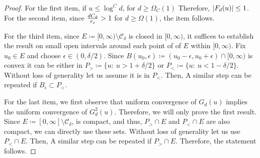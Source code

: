 \begin{proof}
For the first item,  if $u \leq \log^{C} d$, for $d \geq \Omega_{C}(1)$ 
Therefore,  $\lvert F_d(u) \rvert \leq 1$.  For the second item, since  $\tfrac{d C_d }{r_s}  > 1$ for $d   \geq \Omega(1)$,  the item follows.

For the third item,  since  $E \coloneqq [0,\infty)  \setminus  \mathcal{C}_{\delta}$ is closed in $ [0,\infty)$,  it suffices to establish the result on small open intervals around each point of  of $E$ within  $[0,\infty)$.  Fix $u_0 \in E$ and choose $\epsilon \in (0,\delta/2)$.  Since  $B(u_0, \epsilon) \coloneqq (u_0 - \epsilon, u_0 + \epsilon) \cap [0,\infty)$ is convex it can be either in   $P_{>} \coloneqq \{ u : ~ u  > 1 + \delta/2   \}$  or  $P_{<} \coloneqq  \{ u  : ~   u  < 1  -\delta/2 \}$. Without loss of generality let us assume it is in  $P_{<}$. Then,
A similar step can be repeated if   $B_{\epsilon} \subset P_{<}$.

\smallskip
For the last item,  we first observe that uniform convergence of   $G_d(u)$  implies the uniform convergence of  $G^2_d(u) $. Therefore, we will only prove the first result.  Since  $E \coloneqq [0,\infty]  \setminus  \mathcal{C}_{\delta}$,  is compact, and thus, $P_{>} \cap E$ and $P_{<} \cap E$ are also compact,   we can directly use these sets. Without loss of generality let us use  $P_{<} \cap E$. Then,
A similar step can be repeated if  $P_{>} \cap E$. Therefore, the statement follows.
\end{proof} 

